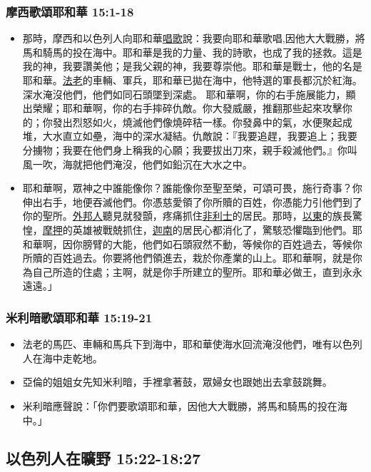 \subsubsection{摩西歌頌耶和華 15:1-18}
\begin{itemize} 
\itemsep-.35em 
\item 那時，摩西和以色列人向耶和華\underline{唱歌}說：我要向耶和華歌唱,因他大大戰勝，將馬和騎馬的投在海中。耶和華是我的力量、我的詩歌，也成了我的拯救。這是我的神，我要讚美他；是我父親的神，我要尊崇他。耶和華是戰士，他的名是耶和華。\underline{法老}的車輛、軍兵，耶和華已拋在海中，他特選的軍長都沉於紅海。深水淹沒他們，他們如同石頭墜到深處。 耶和華啊，你的右手施展能力，顯出榮耀；耶和華啊，你的右手摔碎仇敵。你大發威嚴，推翻那些起來攻擊你的；你發出烈怒如火，燒滅他們像燒碎秸一樣。你發鼻中的氣，水便聚起成堆，大水直立如壘，海中的深水凝結。仇敵說：『我要追趕，我要追上；我要分擄物；我要在他們身上稱我的心願；我要拔出刀來，親手殺滅他們。』你叫風一吹，海就把他們淹沒，他們如鉛沉在大水之中。 
\item 耶和華啊，眾神之中誰能像你？誰能像你至聖至榮，可頌可畏，施行奇事？你伸出右手，地便吞滅他們。你憑慈愛領了你所贖的百姓，你憑能力引他們到了你的聖所。\underline{外邦人}聽見就發顫，疼痛抓住\underline{非利士}的居民。那時，\underline{以東}的族長驚惶，\underline{摩押}的英雄被戰兢抓住，\underline{迦南}的居民心都消化了，驚駭恐懼臨到他們。耶和華啊，因你膀臂的大能，他們如石頭寂然不動，等候你的百姓過去，等候你所贖的百姓過去。你要將他們領進去，栽於你產業的山上。耶和華啊，就是你為自己所造的住處；主啊，就是你手所建立的聖所。耶和華必做王，直到永永遠遠。」
\end{itemize}

\subsubsection{米利暗歌頌耶和華 15:19-21}
\begin{itemize} 
\itemsep-.35em
\item 法老的馬匹、車輛和馬兵下到海中，耶和華使海水回流淹沒他們，唯有以色列人在海中走乾地。 
\item 亞倫的姐姐女先知米利暗，手裡拿著鼓，眾婦女也跟她出去拿鼓跳舞。
\item 米利暗應聲說：「你們要歌頌耶和華，因他大大戰勝，將馬和騎馬的投在海中。」
\end{itemize}

\subsection{以色列人在曠野 15:22-18:27}
